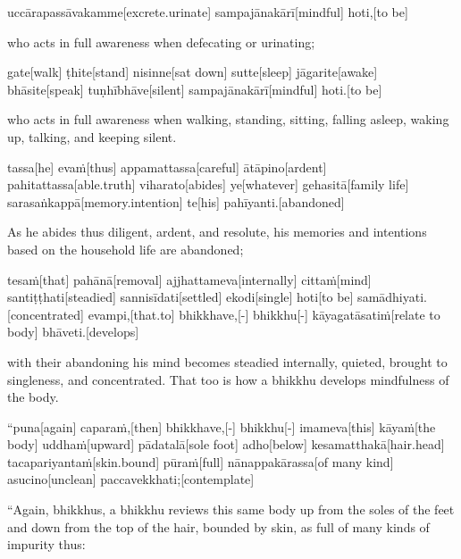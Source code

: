 \begin{samepage}
\begingl[glneveryline={\PaliGlossA,\PaliGlossB}]
uccārapassāvakamme[excrete.urinate] sampajānakārī[mindful] hoti,[to be]
\endgl
\nopagebreak
\linespread{0.5}
\begin{spacin}{0.2}
{\PaliGlossFT who acts in full awareness when defecating or urinating;}
\end{spacin}
\vskip 12pt
\end{samepage}
\begin{samepage}
\begingl[glneveryline={\PaliGlossA,\PaliGlossB}]
gate[walk] ṭhite[stand] nisinne[sat down] sutte[sleep] jāgarite[awake] bhāsite[speak] tuṇhībhāve[silent] sampajānakārī[mindful] hoti.[to be]
\endgl
\nopagebreak
\linespread{0.5}
\begin{spacin}{0.2}
{\PaliGlossFT who acts in full awareness when walking, standing, sitting, falling asleep, waking up, talking, and keeping silent.}
\end{spacin}
\vskip 12pt
\end{samepage}
\begin{samepage}
\begingl[glneveryline={\PaliGlossA,\PaliGlossB}]
tassa[he] evaṁ[thus] appamattassa[careful] ātāpino[ardent] pahitattassa[able.truth] viharato[abides] ye[whatever] gehasitā[family life] sarasaṅkappā[memory.intention] te[his] pahīyanti.[abandoned]
\endgl
\nopagebreak
\linespread{0.5}
\begin{spacin}{0.2}
{\PaliGlossFT As he abides thus diligent, ardent, and resolute, his memories and intentions based on the household life are abandoned;}
\end{spacin}
\vskip 12pt
\end{samepage}
\begin{samepage}
\begingl[glneveryline={\PaliGlossA,\PaliGlossB}]
tesaṁ[that] pahānā[removal] ajjhattameva[internally] cittaṁ[mind] santiṭṭhati[steadied] sannisīdati[settled] ekodi[single] hoti[to be] samādhiyati.[concentrated] evampi,[that.to] bhikkhave,[-] bhikkhu[-] kāyagatāsatiṁ[relate to body] bhāveti.[develops]
\endgl
\nopagebreak
\linespread{0.5}
\begin{spacin}{0.2}
{\PaliGlossFT with their abandoning his mind becomes steadied internally, quieted, brought to singleness, and concentrated. That too is how a bhikkhu develops mindfulness of the body.}
\end{spacin}
\vskip 12pt
\end{samepage}
\vskip 0.05in
\begin{samepage}
\begingl[glneveryline={\PaliGlossA,\PaliGlossB}]
“puna[again] caparaṁ,[then] bhikkhave,[-] bhikkhu[-] imameva[this] kāyaṁ[the body] uddhaṁ[upward] pādatalā[sole foot] adho[below] kesamatthakā[hair.head] tacapariyantaṁ[skin.bound] pūraṁ[full] nānappakārassa[of many kind] asucino[unclean] paccavekkhati;[contemplate]
\endgl
\nopagebreak
\linespread{0.5}
\begin{spacin}{0.2}
{\PaliGlossFT “Again, bhikkhus, a bhikkhu reviews this same body up from the soles of the feet and down from the top of the hair, bounded by skin, as full of many kinds of impurity thus:}
\end{spacin}
\vskip 12pt
\end{samepage}
